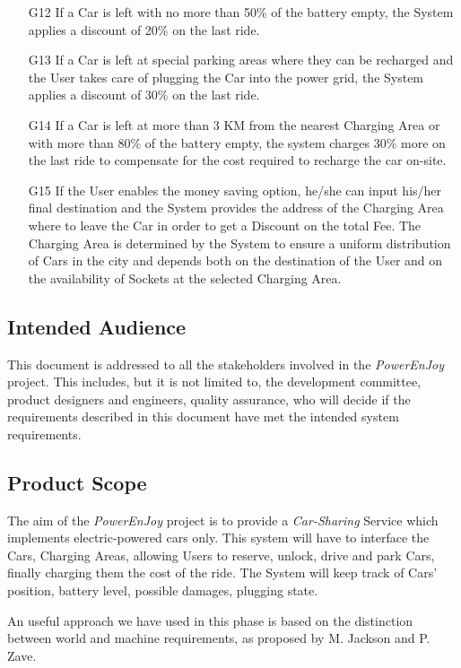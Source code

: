 \begin{enumerate}
	\item[G12] If a Car is left with no more than 50\% of the battery empty, the System applies a discount of 20\% on the last ride. 
	\item[G13] If a Car is left at special parking areas where they can be recharged and the User takes care of plugging the Car into the power grid, the System applies a discount of 30\% on the last ride. 
	\item[G14] If a Car is left at more than 3 KM from the nearest Charging Area or with more than 80\% of the battery empty, the system charges 30\% more on the last ride to compensate for the cost required to recharge the car on-site.
	\item[G15] If the User enables the money saving option, he/she can input his/her final destination and the System provides the address of the Charging Area where to leave the Car in order to get a Discount on the total Fee. The Charging Area is determined by the System to ensure a uniform distribution of Cars in the city and depends both on the destination of the User and on the availability of Sockets at the selected Charging Area. 
\end{enumerate}


\subsection{Intended Audience}
This document is addressed to all the stakeholders involved in the \emph{PowerEnJoy} project. This includes, but it is not limited to, the development committee, product designers and engineers, quality assurance, who will decide if the requirements described in this document have met the intended system requirements.

\subsection{Product Scope}
The aim of the \emph{PowerEnJoy} project is to provide a \textit{Car-Sharing} Service which implements electric-powered cars only.
This system will have to interface the Cars, Charging Areas, allowing Users to reserve, unlock, drive and park Cars, finally charging them the cost of the ride. 
The System will keep track of Cars' position, battery level, possible damages, plugging state.

An useful approach we have used in this phase is based on the distinction between world and machine requirements, as proposed by M. Jackson and P. Zave.

